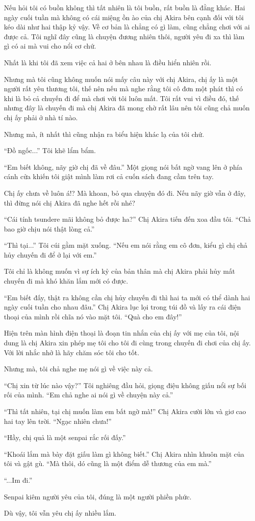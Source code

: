 {Nếu hỏi tôi có buồn không thì tất nhiên là tôi buồn, rất buồn là đằng
khác. Hai ngày cuối tuần mà không có cái miệng ồn ào của chị Akira bên
cạnh đối với tôi kéo dài như hai thập kỷ vậy. Về cơ bản là chẳng có gì
làm, cũng chẳng chơi với ai được cả. Tôi nghĩ đây cũng là chuyện đương
nhiên thôi, người yêu đi xa thì làm gì có ai mà vui cho nổi cơ chứ.

Nhất là khi tôi đã xem việc cả hai ở bên nhau là điều hiển nhiên rồi.

Nhưng mà tôi cũng không muốn nói mấy câu này với chị Akira, chị ấy là
một người rất yêu thương tôi, thế nên nếu mà nghe rằng tôi cô đơn một
phát thì có khi là bỏ cả chuyến đi để mà chơi với tôi luôn mất. Tôi rất
vui vì điều đó, thế nhưng đây là chuyến đi mà chị Akira đã mong chờ rất
lâu nên tôi cũng chả muốn chị ấy phải ở nhà tí nào.

Nhưng mà, ít nhất thì cũng nhận ra biểu hiện khác lạ của tôi chứ.

``Đồ ngốc...'' Tôi khẽ lẩm bẩm.

``Em biết không, nãy giờ chị đã về đâu.'' Một giọng nói bất ngờ vang lên
ở phía cánh cửa khiến tôi giật mình làm rơi cả cuốn sách đang cầm trên
tay.

Chị ấy chưa về luôn á!? Mà khoan, bỏ qua chuyện đó đi. Nếu nãy giờ vẫn ở
đây, thì đừng nói chị Akira đã nghe hết rồi nhé?

``Cái tính tsundere mãi không bỏ được ha?'' Chị Akira tiến đến xoa đầu
tôi. ``Chả bao giờ chịu nói thật lòng cả.''

``Thì tại...'' Tôi cúi gằm mặt xuống. ``Nếu em nói rằng em cô đơn, kiểu
gì chị chả hủy chuyến đi để ở lại với em.''

Tôi chỉ là không muốn vì sự ích kỷ của bản thân mà chị Akira phải hủy
mất chuyến đi mà khó khăn lắm mới có được.

``Em biết đấy, thật ra không cần chị hủy chuyến đi thì hai ta mới có thể
dành hai ngày cuối tuần cho nhau đâu.'' Chị Akira lục lọi trong túi đồ
và lấy ra cái điện thoại của mình rồi chĩa nó vào mặt tôi. ``Quà cho em
đây!''

Hiện trên màn hình điện thoại là đoạn tin nhắn của chị ấy với mẹ của
tôi, nội dung là chị Akira xin phép mẹ tôi cho tôi đi cùng trong chuyến
đi chơi của chị ấy. Với lời nhắc nhở là hãy chăm sóc tôi cho tốt.

Nhưng mà, tôi chả nghe mẹ nói gì về việc này cả.

``Chị xin từ lúc nào vậy?'' Tôi nghiêng đầu hỏi, giọng điệu không giấu
nổi sự bối rối của mình. ``Em chả nghe ai nói gì về chuyện này cả.''

``Thì tất nhiên, tại chị muốn làm em bất ngờ mà!'' Chị Akira cười lớn và
giơ cao hai tay lên trời. ``Ngạc nhiên chưa!''

``Hầy, chị quả là một senpai rắc rối đấy.''

``Khoái lắm mà bày đặt giấu làm gì không biết.'' Chị Akira nhìn khuôn
mặt của tôi và gật gù. ``Mà thôi, dó cũng là một điểm dễ thương của em
mà.''

``...Im đi.''

Senpai kiêm người yêu của tôi, đúng là một người phiền phức.

Dù vậy, tôi vẫn yêu chị ấy nhiều lắm.
}
